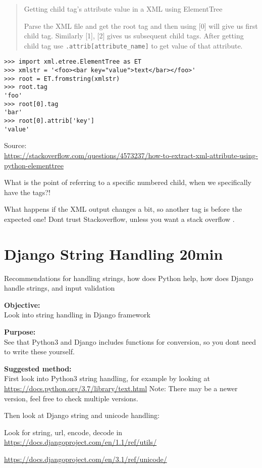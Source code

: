 \documentclass[a4paper,11pt,notitlepage]{report}
\begin{document}
\begin{quote}
Getting child tag's attribute value in a XML using ElementTree

Parse the XML file and get the root tag and then using [0] will give us first child tag. Similarly [1], [2] gives us subsequent child tags. After getting child tag use \verb+.attrib[attribute_name]+ to get value of that attribute.
\end{quote}
\begin{verbatim}
>>> import xml.etree.ElementTree as ET
>>> xmlstr = '<foo><bar key="value">text</bar></foo>'
>>> root = ET.fromstring(xmlstr)
>>> root.tag
'foo'
>>> root[0].tag
'bar'
>>> root[0].attrib['key']
'value'
\end{verbatim}
Source:\\{\footnotesize \url{https://stackoverflow.com/questions/4573237/how-to-extract-xml-attribute-using-python-elementtree}}

What is the point of referring to a specific numbered child, when we specifically have the tags?!

What happens if the XML output changes a bit, so another tag is before the expected one! Dont trust Stackoverflow, unless you want a stack overflow \smiley.


\chapter{Django String Handling 20min}
\label{ex:django-string}

Recommendations for handling strings, how does Python help, how does Django handle strings, and input validation

{\bf Objective:}\\
Look into string handling in Django framework

{\bf Purpose:}\\
See that Python3 and Django includes functions for conversion, so you dont need to write these yourself.

{\bf Suggested method:}\\
First look into Python3 string handling, for example by looking at\\
\url{https://docs.python.org/3.7/library/text.html}
Note: There may be a newer version, feel free to check multiple versions.

Then look at Django string and unicode handling:
\begin{list2}
\item Look for string, url, encode, decode in\\ \url{https://docs.djangoproject.com/en/1.1/ref/utils/}
\item \url{https://docs.djangoproject.com/en/3.1/ref/unicode/}
\end{list2}
\end{document}
